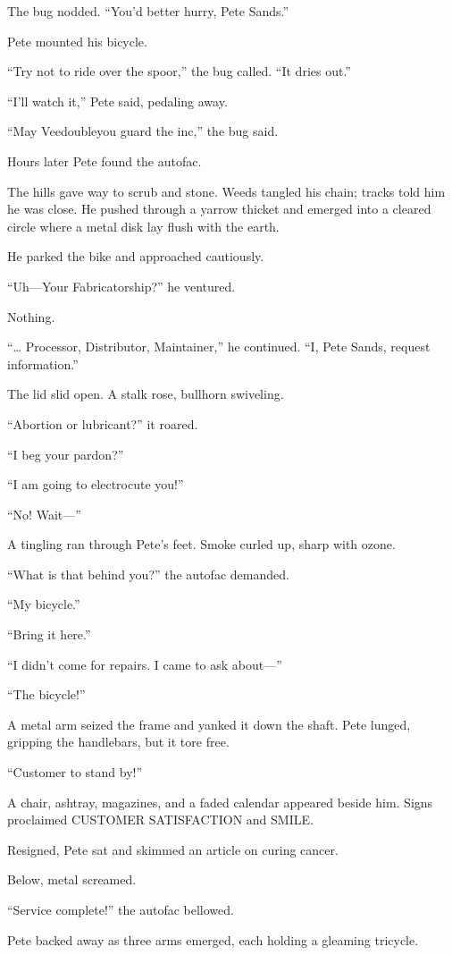 The bug nodded. “You’d better hurry, Pete Sands.”

Pete mounted his bicycle.

“Try not to ride over the spoor,” the bug called. “It dries out.”

“I’ll watch it,” Pete said, pedaling away.

“May Veedoubleyou guard the inc,” the bug said.

Hours later Pete found the autofac.

The hills gave way to scrub and stone. Weeds tangled his chain; tracks told him he was close. He pushed through a yarrow thicket and emerged into a cleared circle where a metal disk lay flush with the earth.

He parked the bike and approached cautiously.

“Uh—Your Fabricatorship?” he ventured.

Nothing.

“… Processor, Distributor, Maintainer,” he continued. “I, Pete Sands, request information.”

The lid slid open. A stalk rose, bullhorn swiveling.

“Abortion or lubricant?” it roared.

“I beg your pardon?”

“I am going to electrocute you!”

“No! Wait—”

A tingling ran through Pete’s feet. Smoke curled up, sharp with ozone.

“What is that behind you?” the autofac demanded.

“My bicycle.”

“Bring it here.”

“I didn’t come for repairs. I came to ask about—”

“The bicycle!”

A metal arm seized the frame and yanked it down the shaft. Pete lunged, gripping the handlebars, but it tore free.

“Customer to stand by!”

A chair, ashtray, magazines, and a faded calendar appeared beside him. Signs proclaimed CUSTOMER SATISFACTION and SMILE.

Resigned, Pete sat and skimmed an article on curing cancer.

Below, metal screamed.

“Service complete!” the autofac bellowed.

Pete backed away as three arms emerged, each holding a gleaming tricycle.

